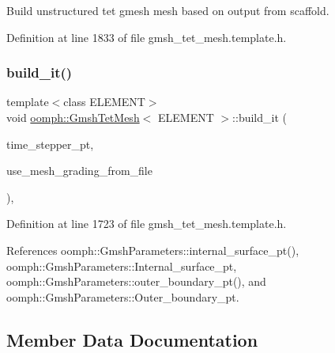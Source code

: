 Build unstructured tet gmesh mesh based on output from scaffold. 



Definition at line 1833 of file gmsh\+\_\+tet\+\_\+mesh.\+template.\+h.

\mbox{\label{classoomph_1_1GmshTetMesh_aaec22ccd211f81dd440e9618d6667718}} 
\subsubsection{\texorpdfstring{build\+\_\+it()}{build\_it()}}
{\footnotesize\ttfamily template$<$class E\+L\+E\+M\+E\+NT$>$ \\
void \hyperlink{classoomph_1_1GmshTetMesh}{oomph\+::\+Gmsh\+Tet\+Mesh}$<$ E\+L\+E\+M\+E\+NT $>$\+::build\+\_\+it (\begin{DoxyParamCaption}\item[{Time\+Stepper $\ast$}]{time\+\_\+stepper\+\_\+pt,  }\item[{const bool \&}]{use\+\_\+mesh\+\_\+grading\+\_\+from\+\_\+file }\end{DoxyParamCaption})\hspace{0.3cm}{\ttfamily [inline]}, {\ttfamily [private]}}



Definition at line 1723 of file gmsh\+\_\+tet\+\_\+mesh.\+template.\+h.



References oomph\+::\+Gmsh\+Parameters\+::internal\+\_\+surface\+\_\+pt(), oomph\+::\+Gmsh\+Parameters\+::\+Internal\+\_\+surface\+\_\+pt, oomph\+::\+Gmsh\+Parameters\+::outer\+\_\+boundary\+\_\+pt(), and oomph\+::\+Gmsh\+Parameters\+::\+Outer\+\_\+boundary\+\_\+pt.



\subsection{Member Data Documentation}
\mbox{\label{classoomph_1_1GmshTetMesh_a6d9878df9dfca45b4883909ed1e78536}} 
